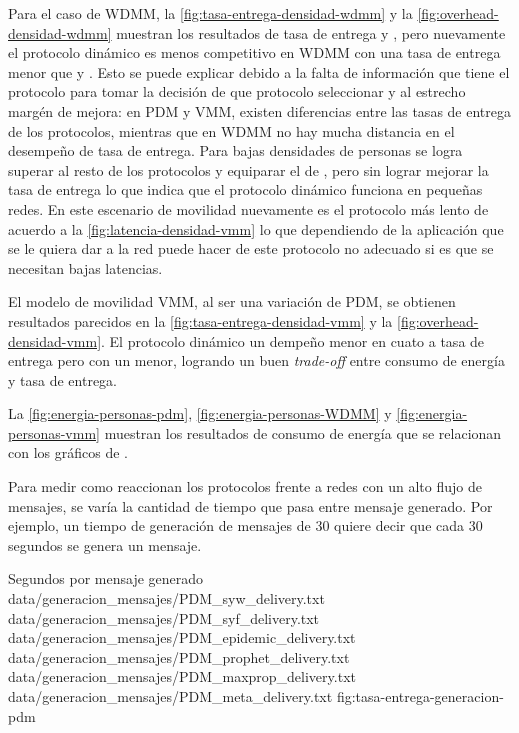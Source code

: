 Para el caso de WDMM, la \ref{fig:tasa-entrega-densidad-wdmm} y la
\ref{fig:overhead-densidad-wdmm} muestran los resultados de tasa de entrega y
\overhead, pero nuevamente el protocolo dinámico es menos competitivo en WDMM
con una tasa de entrega menor que \maxprop{} y \syf{}. Esto se puede explicar
debido a la falta de información que tiene el protocolo para tomar la decisión
de que protocolo seleccionar y al estrecho margén de mejora: en PDM y VMM,
existen diferencias entre las tasas de entrega de los protocolos, mientras que
en WDMM no hay mucha distancia en el desempeño de tasa de entrega. Para bajas
densidades de personas se logra superar al resto de los protocolos y equiparar
el \overhead{} de \prophet{}, pero sin lograr mejorar la tasa de entrega lo que
indica que el protocolo dinámico funciona en pequeñas redes. En este escenario
de movilidad nuevamente \syf{} es el protocolo más lento de acuerdo a la
\ref{fig:latencia-densidad-vmm} lo que dependiendo de la aplicación que se le
quiera dar a la red puede hacer de este protocolo no adecuado si es que se
necesitan bajas latencias.


El modelo de movilidad VMM, al ser una variación de PDM, se obtienen resultados
parecidos en la \ref{fig:tasa-entrega-densidad-vmm} y la
\ref{fig:overhead-densidad-vmm}. El protocolo dinámico un dempeño menor en cuato
a tasa de entrega pero con un \overhead{} menor, logrando un buen
\textit{trade-off} entre consumo de energía y tasa de entrega.


La \ref{fig:energia-personas-pdm}, \ref{fig:energia-personas-WDMM} y
\ref{fig:energia-personas-vmm} muestran los resultados de consumo de energía
que se relacionan con los gráficos de \overhead.





Para medir como reaccionan los protocolos frente a redes con un alto flujo de
mensajes, se varía la cantidad de tiempo que pasa entre mensaje generado. Por
ejemplo, un tiempo de generación de mensajes de 30 quiere decir que cada 30
segundos se genera un mensaje.



{
\graficoDeliveryProtocolos
{Segundos por mensaje generado}
{data/generacion_mensajes/PDM_syw_delivery.txt}
{data/generacion_mensajes/PDM_syf_delivery.txt}
{data/generacion_mensajes/PDM_epidemic_delivery.txt}
{data/generacion_mensajes/PDM_prophet_delivery.txt}
{data/generacion_mensajes/PDM_maxprop_delivery.txt}
{data/generacion_mensajes/PDM_meta_delivery.txt}
}{fig:tasa-entrega-generacion-pdm}

